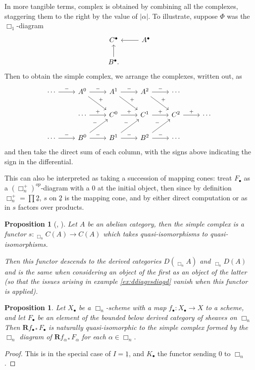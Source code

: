 \documentclass[proquest]{uwthesis}[2014/11/13]
\newtheorem{prop}[theorem]{Proposition}
\theoremstyle{definition}
\DeclareMathOperator{\Diag}{\underline{Diag}}
\newcommand{\bR}{\textbf{R}}
\newcommand{\tu}{\underline{2}}
\begin{document}
In more tangible terms, complex is obtained by combining all the complexes, staggering them to the right by the value of $|\alpha|$.
To illustrate, suppose $\Phi$ was the $\Box_1$-diagram
\[
\begin{tikzcd}
C^\bullet & \arrow{l} A^\bullet \\
B^\bullet \arrow{u}.
\end{tikzcd}
\]
Then to obtain the simple complex, we arrange the complexes, written out, as
\[
\begin{tikzcd}
\cdots \arrow{r}{-} &  A^0 \arrow{r}{-} \arrow{dr}{+} & A^1 \arrow{r}{-} \arrow{dr}{+} & A^2 \arrow{r}{-} \arrow{dr}{+} & \cdots \\
& \cdots \arrow{r}{+} & C^0 \arrow{r}{+} & C^1 \arrow{r}{+} & C^2 \arrow{r}{+} & \cdots \\
\cdots \arrow{r}{-} & B^0 \arrow{r}{-} \arrow{ur}{-} & B^1 \arrow{r}{-} \arrow{ur}{-} & B^2 \arrow{r}{-} \arrow{ur}{-} & \cdots
\end{tikzcd}
\]
and then take the direct sum of each column, with the signs above indicating the sign in the differential.

This can also be interpreted as taking a succession of mapping cones: treat $F_\bullet$ as a $(\Box_n^+)^{op}$-diagram with a 0 at the initial object, then since by definition $\Box_n^+ = \prod \tu$, $s$ on $\tu$ is the mapping cone, and by either direct computation or as in \cite{Guillen2002} $s$ factors over products.

\begin{prop}[{\cite[I 6.3]{Guillen1988}}, {\cite[1.3.1]{Guillen2002}}]
	Let $A$ be an abelian category, then the simple complex is a functor $s:\Diag_{\Box_n} C(A) \rightarrow C(A)$ which takes quasi-isomorphisms to quasi-isomorphisms.
	
	Then this functor descends to the derived categories $D(\Diag_{\Box_n} A)$ and $\Diag_{\Box_n} D(A)$ and is the same when considering an object of the first as an object of the latter (so that the issues arising in example \ref{ex:ddiagvsdiagd} vanish when this functor is applied).
\end{prop}
\begin{prop}
	\label{thm:simple}
	Let $X_\bullet$ be a $\Box_n$-scheme with a map $f_\bullet : X_\bullet \rightarrow X$ to a scheme, and let $F_\bullet$ be an element of the bounded below derived category of sheaves on $\Box_n$
	Then $\bR f_{\bullet *} F_\bullet$ is naturally quasi-isomorphic to the simple complex formed by the $\Box_n$ diagram of $\bR f_{\alpha *} F_\alpha$ for each $\alpha \in \Box_n$.
\end{prop}
\begin{proof}
	This is \cite[I 6.6]{Guillen1988} in the special case of $I = \underline{1}$, and $K_\bullet$ the functor sending 0 to $\Box_n$.
\end{proof}
\end{document}
